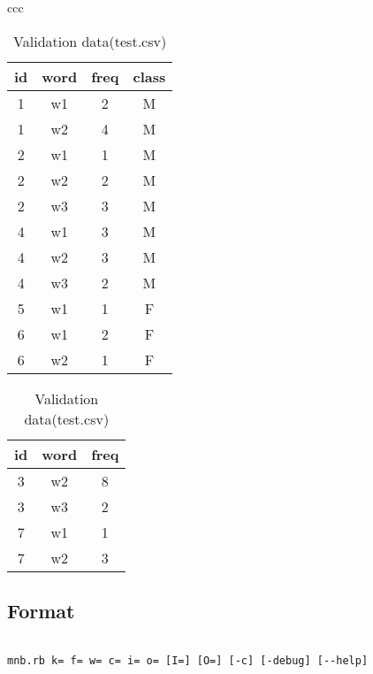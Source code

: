\begin{table}[htbp]
\begin{center}
\begin{tabular}{ccc}

\begin{minipage}{0.3\hsize}
\begin{center}
\caption{Training data(train.csv)\label{tbl:inp1}}
{\small
\begin{tabular}{cccc}
\hline
id & word & freq & class\\
\hline
1 & w1 & 2 & M\\
1 & w2 & 4 & M\\
2 & w1 & 1 & M\\
2 & w2 & 2 & M\\
2 & w3 & 3 & M\\
4 & w1 & 3 & M\\
4 & w2 & 3 & M\\
4 & w3 & 2 & M\\
5 & w1 & 1 & F\\
6 & w1 & 2 & F\\
6 & w2 & 1 & F\\
\hline
\end{tabular} 
}
\end{center}
\end{minipage}

\begin{minipage}{0.3\hsize}
\begin{center}
\caption{Validation data(test.csv)\label{tbl:inp2}}
{\small
\begin{tabular}{ccc}
\hline
id & word & freq\\
\hline
3 & w2 & 8\\
3 & w3 & 2\\
7 & w1 & 1\\
7 & w2 & 3\\
\hline
\end{tabular} 
}
\end{center}
\end{minipage}

\end{tabular} 
\end{center}
\end{table}

\subsection*{Format}
\begin{verbatim}

mnb.rb k= f= w= c= i= o= [I=] [O=] [-c] [-debug] [--help] 

\end{verbatim}

